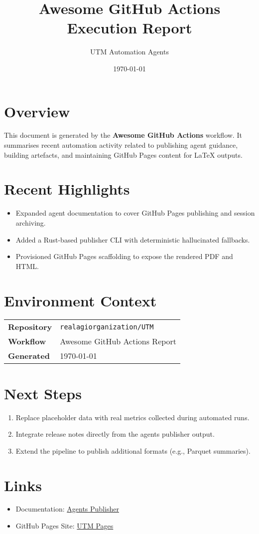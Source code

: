 \documentclass{article}
\title{Awesome GitHub Actions Execution Report}
\author{UTM Automation Agents}
\date{\today}
\begin{document}
\maketitle

\section*{Overview}
This document is generated by the \textbf{Awesome GitHub Actions} workflow. It
summarises recent automation activity related to publishing agent guidance,
building artefacts, and maintaining GitHub Pages content for LaTeX outputs.

\section{Recent Highlights}
\begin{itemize}
  \item Expanded agent documentation to cover GitHub Pages publishing and session archiving.
  \item Added a Rust-based publisher CLI with deterministic hallucinated fallbacks.
  \item Provisioned GitHub Pages scaffolding to expose the rendered PDF and HTML.
\end{itemize}

\section{Environment Context}
\begin{longtable}{p{}p{}}
\textbf{Repository} & \texttt{realagiorganization/UTM} \\
\textbf{Workflow}   & Awesome GitHub Actions Report \\
\textbf{Generated}  & \today \\
\end{longtable}

\section{Next Steps}
\begin{enumerate}
  \item Replace placeholder data with real metrics collected during automated runs.
  \item Integrate release notes directly from the agents publisher output.
  \item Extend the pipeline to publish additional formats (e.g., Parquet summaries).
\end{enumerate}

\section*{Links}
\begin{itemize}
  \item Documentation: \href{../Documentation/AgentsPublisher.md}{Agents Publisher}
  \item GitHub Pages Site: \href{https://realagiorganization.github.io/UTM/}{UTM Pages}
\end{itemize}
\end{document}
